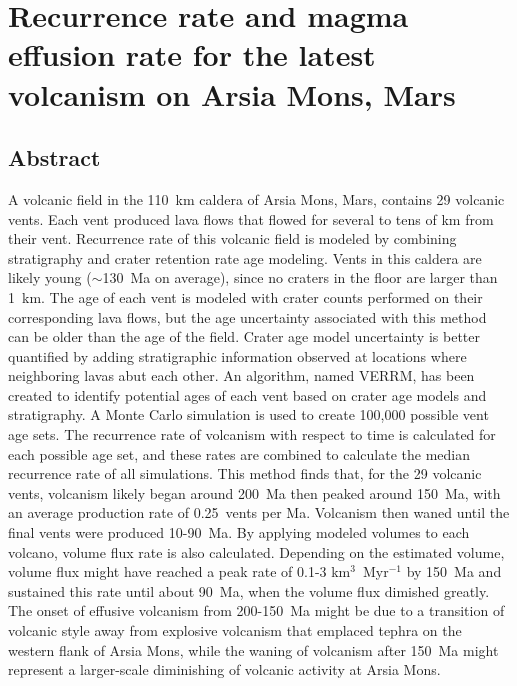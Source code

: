 \chapter[Recurrence rate and magma effusion rate for the latest volcanism on Arsia Mons, Mars]{Recurrence rate and magma effusion rate for the latest volcanism on Arsia Mons, Mars}\label{ch_arsia}

\renewcommand*{\FigPath}{../Chapter-arsia/figures}

\section{Abstract}
A volcanic field in the 110~km caldera of Arsia Mons, Mars, contains 29 volcanic vents. Each vent produced lava flows that flowed for several to tens of km from their vent. Recurrence rate of this volcanic field is modeled by combining stratigraphy and crater retention rate age modeling. Vents in this caldera are likely young ($\sim$130~Ma on average), since no craters in the floor are larger than 1~km. The age of each vent is modeled with crater counts performed on their corresponding lava flows, but the age uncertainty associated with this method can be older than the age of the field. Crater age model uncertainty is better quantified by adding stratigraphic information observed at locations where neighboring lavas abut each other. An algorithm, named VERRM, has been created to identify potential ages of each vent based on crater age models and stratigraphy. A Monte Carlo simulation is used to create 100,000 possible vent age sets. The recurrence rate of volcanism with respect to time is calculated for each possible age set, and these rates are combined to calculate the median recurrence rate of all simulations. This method finds that, for the 29 volcanic vents, volcanism likely began around 200~Ma then peaked around 150~Ma, with an average production rate of 0.25~vents per Ma. Volcanism then waned until the final vents were produced 10-90~Ma. By applying modeled volumes to each volcano, volume flux rate is also calculated. Depending on the estimated volume, volume flux might have reached a peak rate of 0.1-3 km$^3$~Myr$^{-1}$ by 150~Ma and sustained this rate until about 90~Ma, when the volume flux dimished greatly. The onset of effusive volcanism from 200-150~Ma might be due to a transition of volcanic style away from explosive volcanism that emplaced tephra on the western flank of Arsia Mons, while the waning of volcanism after 150~Ma might represent a larger-scale diminishing of volcanic activity at Arsia Mons.

